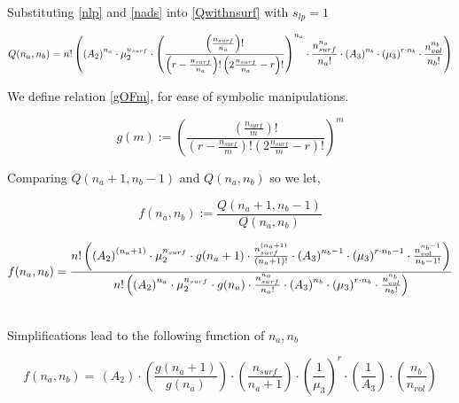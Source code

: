 \documentclass[10pt,letterpaper]{article}
\newcommand{\nads}[1]{
    \ensuremath{
        \frac{
            n_{surf}
        }{
            #1
        }
    }
}
\newcommand{\nlp}[1]{
    \ensuremath{
        r
        -
        \nads{#1}
    }
}
\newcommand{\myQ}[5]{
	\ensuremath{	
		n!
		\left(
		\left(
		A_2
		\right)^{#1}
		\cdot 
		\mu_{2}^{n_{surf}} 
		\cdot 
		#5
		\cdot
		\frac{
		        n_{surf}^{#1}
		    }{
		        #1!
		    }
		\cdot
		\left(
		    A_3
		\right)^{#2}
		\cdot 
		\left(
		    \mu_{3}
		\right)^{r\cdotp #2}
		\cdot
		\frac{
			n_{vol}^{#2}
		}{
			#2!
		}
		\right)
		}
}
\newcommand{\gOFm}[2]{
\left( \frac{
\left(\frac{#2}{#1}\right)!}{ 
\left(r-\frac{#2}{#1}\right)! 
\left(2\frac{#2}{#1}-r\right)!}
\right)^{#1}  
}
\begin{document}
\newpage
\noindent Substituting \ref{nlp} and \ref{nads} into \ref{Qwithnsurf}
%
%
with $s_{lp}=1$

\begin{equation}
	Q(n_a,n_b)=\myQ{n_a}{n_b}{\nads{n_a}}{(\nlp{n_a})}{\gOFm{n_a}{n_{surf}}}
	\label{eq. Qab}
\end{equation}

\noindent We define relation \ref{gOFm}, for ease of symbolic manipulations.

\begin{equation}
    \boxed{g(m):= \gOFm{m}{n_{surf}}}
    \label{gOFm}
\end{equation}


\noindent Comparing $Q(n_a+1,n_b-1)$ and $Q(n_a,n_b)$ so we let,

\begin{equation}
    \boxed{f(n_a,n_b):=\frac{Q(n_a+1,n_b-1)}{Q(n_a,n_b)}}
    \label{QfracDEF}
\end{equation}


\begin{equation}
	f(n_a,n_b)=
	\frac{
		\myQ{(n_a+1)}{n_b-1}{\nads{n_a+1}}{(\nlp{n_a+1})}{g(n_a+1)}
	}{
		\myQ{n_a}{n_b}{\nads{n_a}}{(\nlp{n_a})}{g(n_a)}
	}
	\label{eq. Qratio2}
\end{equation}


\text{}\\

\noindent Simplifications lead to the following function of $n_a,n_b$


\begin{equation}
f(n_a,n_b)=\,
\left(
    A_2
\right)
\cdotp
\left(
	\frac{
		g(n_a+1)
	}{
		g(n_a)
	}
\right)
\cdotp
\left(
    \frac{
    	n_{surf}
    }{
    	n_a+1
    }
\right)
\cdotp
\left(
    \frac{
    	1
    }{
    	\mu_{3}
    }
    \right)^r
\cdot
\left(
    \frac{
        1
    }{
        A_3
    }
\right)
\cdot
\left(
    \frac{
    	n_{b}
    }{
    	n_{vol}	
    } 
\right)
\label{fnanb}
\end{equation}

\end{document}
